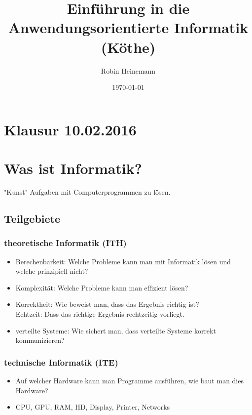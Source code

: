 \documentclass[a4paper]{scrartcl}
\author{Robin Heinemann}
\date{\today}
\title{Einführung in die Anwendungsorientierte Informatik (Köthe)}
\begin{document}
\maketitle
\tableofcontents


\section{Klausur 10.02.2016}
\label{sec-1}

\section{Was ist Informatik?}
\label{sec-2}
"Kunst" Aufgaben mit Computerprogrammen zu lösen.
\subsection{Teilgebiete}
\label{sec-2-1}
\subsubsection{theoretische Informatik (\textbf{ITH})}
\label{sec-2-1-1}
\begin{itemize}
\item Berechenbarkeit: Welche Probleme kann man mit Informatik lösen und welche prinzipiell nicht?
\item Komplexität: Welche Probleme kann man effizient lösen?
\item Korrektheit: Wie beweist man, dass das Ergebnis richtig ist? \\
      Echtzeit: Dass das richtige Ergebnis rechtzeitig vorliegt.
\item verteilte Systeme: Wie sichert man, dass verteilte Systeme korrekt kommunizieren?
\end{itemize}
\subsubsection{technische Informatik (\textbf{ITE})}
\label{sec-2-1-2}
\begin{itemize}
\item Auf welcher Hardware kann man Programme ausführen, wie baut man dies Hardware?
\item CPU, GPU, RAM, HD, Display, Printer, Networks
\end{itemize}
\end{document}
